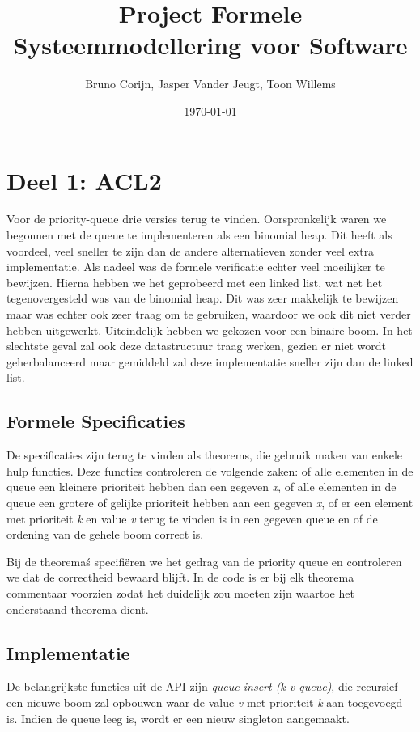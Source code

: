 \documentclass[a4paper,10pt]{article}
\title{Project Formele Systeemmodellering voor Software}
\author{Bruno Corijn, Jasper Vander Jeugt, Toon Willems}
\date{\today}
\begin{document}
\maketitle
\section{Deel 1: ACL2}
Voor de priority-queue drie versies terug te vinden. Oorspronkelijk waren we begonnen met de queue te implementeren als een binomial heap. Dit heeft als voordeel, veel sneller te zijn dan de andere alternatieven zonder veel extra implementatie. Als nadeel was de formele verificatie echter veel moeilijker te bewijzen. Hierna hebben we het geprobeerd met een linked list, wat net het tegenovergesteld was van de binomial heap. Dit was zeer makkelijk te bewijzen maar was echter ook zeer traag om te gebruiken, waardoor we ook dit niet verder hebben uitgewerkt. Uiteindelijk hebben we gekozen voor een binaire boom. In het slechtste geval zal ook deze datastructuur traag werken, gezien er niet wordt geherbalanceerd maar gemiddeld zal deze implementatie sneller zijn dan de linked list.

\subsection{Formele Specificaties}
De specificaties zijn terug te vinden als theorems, die gebruik maken van enkele hulp functies. Deze functies controleren de volgende zaken: of alle elementen in de queue een kleinere prioriteit hebben dan een gegeven \emph{x}, of alle elementen in de queue een grotere of gelijke prioriteit hebben aan een gegeven \emph{x}, of er een element met prioriteit \emph{k} en value \emph{v} terug te vinden is in een gegeven queue en of de ordening van de gehele boom correct is.

Bij de theorema\'s specifi\"eren we het gedrag van de priority queue en controleren we dat de correctheid bewaard blijft. In de code is er bij elk theorema commentaar voorzien zodat het duidelijk zou moeten zijn waartoe het onderstaand theorema dient.

\subsection{Implementatie}
De belangrijkste functies uit de API zijn \emph{queue-insert (k v queue)}, die recursief een nieuwe boom zal opbouwen waar de value \emph{v} met prioriteit \emph{k} aan toegevoegd is. Indien de queue leeg is, wordt er een nieuw singleton aangemaakt. 
\end{document}
